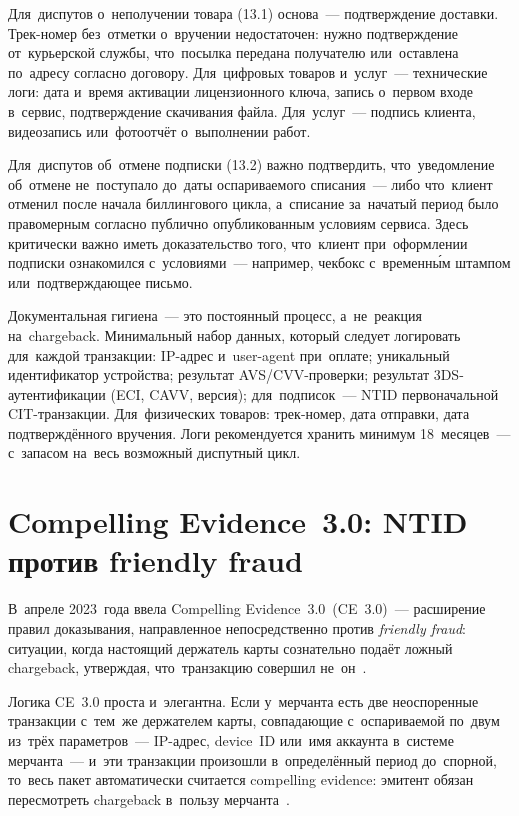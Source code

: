 Для~диспутов о~неполучении товара (13.1) основа~--- подтверждение
доставки. Трек-номер без~отметки о~вручении недостаточен: нужно подтверждение
от~курьерской службы, что~посылка передана получателю или~оставлена
по~адресу согласно договору. Для~цифровых товаров и~услуг~--- технические
логи: дата и~время активации лицензионного ключа, запись о~первом входе
в~сервис, подтверждение скачивания файла. Для~услуг~--- подпись клиента,
видеозапись или~фотоотчёт о~выполнении работ.

Для~диспутов об~отмене подписки (13.2) важно подтвердить,
что~уведомление об~отмене не~поступало до~даты оспариваемого списания~---
либо что~клиент отменил после начала биллингового цикла, а~списание
за~начатый период было правомерным согласно публично опубликованным
условиям сервиса. Здесь критически важно иметь доказательство того,
что~клиент при~оформлении подписки ознакомился с~условиями~--- например,
чекбокс с~временны́м штампом или~подтверждающее письмо.

\begin{practice}
  Документальная гигиена~--- это постоянный процесс, а~не~реакция
  на~chargeback. Минимальный набор данных, который следует логировать для~каждой
  транзакции: IP-адрес и~user-agent при~оплате; уникальный идентификатор
  устройства; результат AVS/CVV-проверки; результат 3DS-аутентификации
  (ECI, CAVV, версия); для~подписок~--- NTID первоначальной CIT-транзакции.
  Для~физических товаров: трек-номер, дата отправки, дата подтверждённого
  вручения. Логи рекомендуется хранить минимум 18~месяцев~--- с~запасом
  на~весь возможный диспутный цикл.
\end{practice}


\section{Compelling Evidence~3.0: NTID против friendly fraud}
\label{sec:disputes-ce30}

В~апреле 2023~года  ввела Compelling Evidence~3.0~(CE~3.0)~---
расширение правил доказывания, направленное непосредственно против
\textit{friendly fraud}: ситуации, когда настоящий держатель карты
сознательно подаёт ложный chargeback, утверждая, что~транзакцию совершил
не~он~.

Логика CE~3.0 проста и~элегантна. Если у~мерчанта есть две неоспоренные
транзакции с~тем~же держателем карты, совпадающие с~оспариваемой по~двум
из~трёх параметров~--- IP-адрес, device~ID или~имя аккаунта в~системе
мерчанта~--- и~эти транзакции произошли в~определённый период до~спорной,
то~весь пакет автоматически считается compelling evidence: эмитент обязан
пересмотреть chargeback в~пользу мерчанта~.

